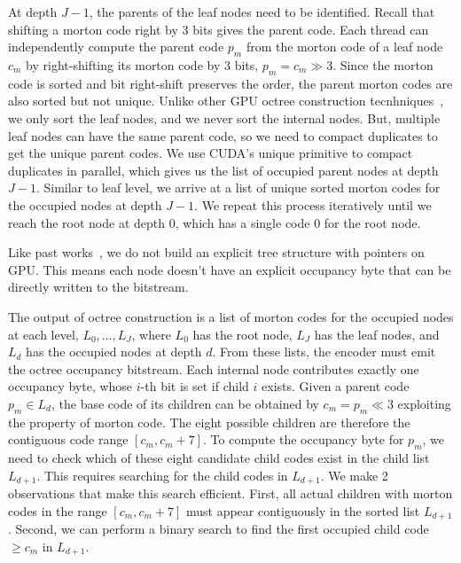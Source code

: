 At depth $J-1$, the parents of the leaf nodes need to be identified.
%
Recall that shifting a morton code right by 3 bits gives the parent code.
%
Each thread can independently compute the parent code $p_m$ from the morton code of a leaf node $c_m$ by right-shifting its morton code by 3 bits, $p_m = c_m \gg 3$.
%
Since the morton code is sorted and bit right-shift preserves the order, the parent morton codes are also sorted but not unique.
%
Unlike other GPU octree construction tecnhniques~\cite{octree-cpu2008,octree-gpu2011,octree-gpu2012}, we only sort the leaf nodes, and we never sort the internal nodes.
%
But, multiple leaf nodes can have the same parent code, so we need to compact duplicates to get the unique parent codes.
%
We use CUDA's unique primitive to compact duplicates in parallel, which gives us the list of occupied parent nodes at depth $J-1$.
%
Similar to leaf level, we arrive at a list of unique sorted morton codes for the occupied nodes at depth $J-1$.
%
We repeat this process iteratively until we reach the root node at depth 0, which has a single code 0 for the root node.

%
Like past works~\cite{octree-cpu2008,octree-gpu2011,octree-gpu2012}, we do not build an explicit tree structure with pointers on GPU.
%
This means each node doesn't have an explicit occupancy byte that can be directly written to the bitstream.

The output of octree construction is a list of morton codes for the occupied nodes at each level, \ie $L_0,\ldots,L_J$, where $L_0$ has the root node, $L_J$ has the leaf nodes, and $L_d$ has the occupied nodes at depth $d$.
%
From these lists, the encoder must emit the octree occupancy bitstream.
%
Each internal node contributes exactly one occupancy byte, whose $i$-th bit is set if child $i$ exists.
%
Given a parent code $p_m\in L_d$, the base code of its children can be obtained by $c_m = p_m \ll 3$ exploiting the property of morton code.
%
The eight possible children are therefore the contiguous code range $[c_m,c_m+7]$.
%
To compute the occupancy byte for $p_m$, we need to check which of these eight candidate child codes exist in the child list $L_{d+1}$.
%
This requires searching for the child codes in $L_{d+1}$.
%
We make 2 observations that make this search efficient. 
%
First, all actual children with morton codes in the range $[c_m,c_m+7]$ must appear contiguously in the sorted list $L_{d+1}$.
%
Second, we can perform a binary search to find the first occupied child code $\geq c_m$ in $L_{d+1}$.

